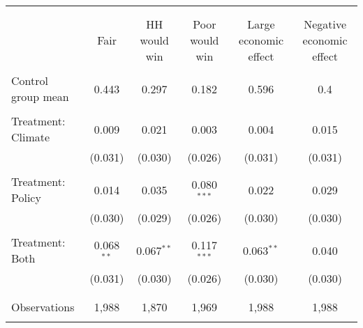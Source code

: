
\begin{tabular}{@{\extracolsep{5pt}}lccccc} 
\\[-1.8ex]\hline 
\hline \\[-1.8ex] 
\\[-1.8ex] & Fair & HH would win & Poor would win & Large economic effect & Negative economic effect \\ 
\hline \\[-1.8ex] 
 Control group mean & 0.443 & 0.297 & 0.182 & 0.596 & 0.4  \\ \hline \\[-1.8ex] Treatment: Climate & 0.009 & 0.021 & 0.003 & 0.004 & 0.015 \\ 
  & (0.031) & (0.030) & (0.026) & (0.031) & (0.031) \\ 
  & & & & & \\ 
 Treatment: Policy & 0.014 & 0.035 & 0.080$^{***}$ & 0.022 & 0.029 \\ 
  & (0.030) & (0.029) & (0.026) & (0.030) & (0.030) \\ 
  & & & & & \\ 
 Treatment: Both & 0.068$^{**}$ & 0.067$^{**}$ & 0.117$^{***}$ & 0.063$^{**}$ & 0.040 \\ 
  & (0.031) & (0.030) & (0.026) & (0.030) & (0.030) \\ 
  & & & & & \\ 
\hline \\[-1.8ex] 

Observations & 1,988 & 1,870 & 1,969 & 1,988 & 1,988 \\ 
\hline 
\hline \\[-1.8ex] 
\end{tabular} 